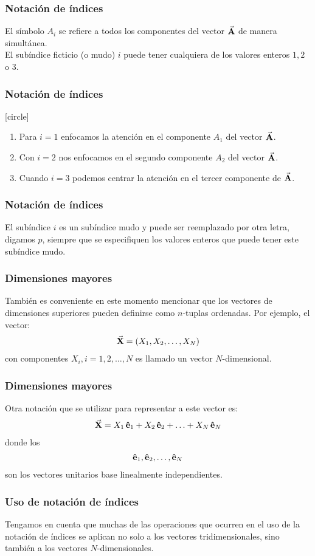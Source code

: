 \documentclass[12pt]{beamer}
\begin{document}
\begin{frame}
\frametitle{Notación de índices}
El símbolo $A_{i}$ se refiere a todos los componentes del vector $\va{A}$ de manera simultánea.
\\
\bigskip
\pause
El subíndice ficticio (o mudo) $i$ puede tener cualquiera de los valores enteros $1, 2$ o $3$.
\end{frame}
\begin{frame}
\frametitle{Notación de índices}
[circle]
\begin{enumerate}[<+->]
\item  Para $i = 1$ enfocamos la atención en el componente $A_{1}$ del vector $\va{A}$.
\item  Con $i = 2$ nos enfocamos en el segundo componente $A_{2}$ del vector $\va{A}$.
\item  Cuando $i = 3$ podemos centrar la atención en el tercer componente de $\va{A}$.
\end{enumerate}
\end{frame}
\begin{frame}
\frametitle{Notación de índices}
El subíndice $i$ es un subíndice mudo y puede ser reemplazado por otra letra, digamos $p$, siempre que se especifiquen los valores enteros que puede tener este subíndice mudo.
\end{frame}
\begin{frame}
\frametitle{Dimensiones mayores}
También es conveniente en este momento mencionar que los vectores de dimensiones superiores pueden definirse como $n$-tuplas ordenadas. Por ejemplo, el vector:
\begin{align*}
\va{X} = (X_{1}, X_{2}, \ldots, X_{N})
\end{align*}
con componentes $X_{i}, i =1, 2, \ldots, N$ es llamado un vector $N$-dimensional.
\end{frame}
\begin{frame}
\frametitle{Dimensiones mayores}
Otra notación que se utilizar para representar a este vector es:
\begin{align*}
\va{X} = X_{1} \, \vu{e}_{1} +  X_{2} \, \vu{e}_{2} +  \ldots +  X_{N} \, \vu{e}_{N}
\end{align*}
donde los
\begin{align*}
\vu{e}_{1}, \vu{e}_{2}, \ldots, \vu{e}_{N}
\end{align*}
son los vectores unitarios base linealmente independientes.
\end{frame}
\begin{frame}
\frametitle{Uso de notación de índices}
Tengamos en cuenta que muchas de las operaciones que ocurren en el uso de la notación de índices se aplican no solo a los vectores tridimensionales, sino también a los vectores $N$-dimensionales.
\end{frame}
\end{document}
